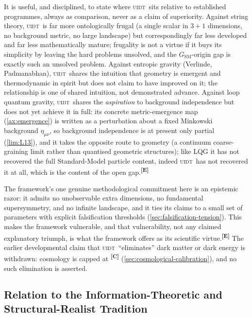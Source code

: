 \documentclass[12pt,a4paper,twoside]{article}
\theoremstyle{plain}
\theoremstyle{definition}
\theoremstyle{remark}
\newcommand{\UIDT}{\textsc{uidt}}
\newcommand{\catmark}[1]{\textsuperscript{\textsf{\textbf{[#1]}}}}
\begin{document}
It is useful, and disciplined, to state where \UIDT\ sits relative to established programmes, always as comparison, never as a claim of superiority. Against string theory, \UIDT\ is far more ontologically frugal (a single scalar in $3+1$ dimensions, no background metric, no large landscape) but correspondingly far less developed and far less mathematically mature; frugality is not a virtue if it buys its simplicity by leaving the hard problems unsolved, and the $G_{\mathrm{SM}}$-origin gap is exactly such an unsolved problem. Against entropic gravity (Verlinde, Padmanabhan), \UIDT\ shares the intuition that geometry is emergent and thermodynamic in spirit but does not claim to have improved on it; the relationship is one of shared intuition, not demonstrated advance. Against loop quantum gravity, \UIDT\ shares the \emph{aspiration} to background independence but does not yet achieve it in full: its concrete metric-emergence map (\cref{ax:emergence}) is written as a perturbation about a fixed Minkowski background $\eta_{\mu\nu}$, so background independence is at present only partial (\cref{lim:L13}), and it takes the opposite route to geometry (a continuum coarse-graining limit rather than quantised geometric structures); like LQG it has not recovered the full Standard-Model particle content, indeed \UIDT\ has not recovered it at all, which is the content of the open gap.\catmark{E}

The framework's one genuine methodological commitment here is an epistemic razor: it admits no unobservable extra dimensions, no fundamental supersymmetry, and no infinite landscape, and it ties its claims to a small set of parameters with explicit falsification thresholds (\cref{sec:falsification-tension}). This makes the framework vulnerable, and that vulnerability, not any claimed explanatory triumph, is what the framework offers as its scientific virtue.\catmark{E} The earlier developmental claim that \UIDT\ ``eliminates'' dark matter or dark energy is withdrawn: cosmology is capped at \catmark{C} (\cref{sec:cosmological-calibration}), and no such elimination is asserted.

\subsection{Relation to the Information-Theoretic and Structural-Realist Tradition}
\label{subsec:prior-art}
\end{document}
